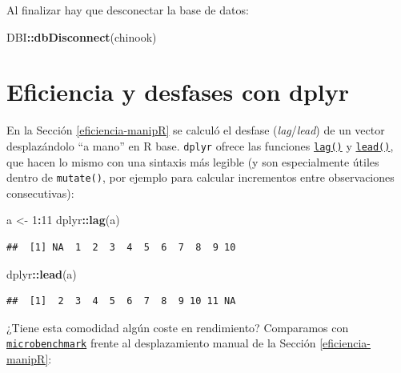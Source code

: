 \documentclass[
]{book}
\newenvironment{Shaded}{\begin{snugshade}}{\end{snugshade}}
\newcommand{\DecValTok}[1]{\textcolor[rgb]{0.00,0.00,0.81}{#1}}
\newcommand{\FunctionTok}[1]{\textcolor[rgb]{0.13,0.29,0.53}{\textbf{#1}}}
\newcommand{\NormalTok}[1]{#1}
\newcommand{\OtherTok}[1]{\textcolor[rgb]{0.56,0.35,0.01}{#1}}
\newcommand{\SpecialCharTok}[1]{\textcolor[rgb]{0.81,0.36,0.00}{\textbf{#1}}}
\theoremstyle{break}
\theoremstyle{nonumberplain}
\begin{document}
Al finalizar hay que desconectar la base de datos:

\begin{Shaded}
\begin{Highlighting}[]
\NormalTok{DBI}\SpecialCharTok{::}\FunctionTok{dbDisconnect}\NormalTok{(chinook)}
\end{Highlighting}
\end{Shaded}

\section{Eficiencia y desfases con dplyr}\label{eficiencia-tidyverse}

En la Sección \ref{eficiencia-manipR} se calculó el desfase (\emph{lag}/\emph{lead}) de un vector desplazándolo ``a mano'' en R base. \texttt{dplyr} ofrece las funciones \href{https://dplyr.tidyverse.org/reference/lead-lag.html}{\texttt{lag()}} y \href{https://dplyr.tidyverse.org/reference/lead-lag.html}{\texttt{lead()}}, que hacen lo mismo con una sintaxis más legible (y son especialmente útiles dentro de \texttt{mutate()}, por ejemplo para calcular incrementos entre observaciones consecutivas):

\begin{Shaded}
\begin{Highlighting}[]
\NormalTok{a }\OtherTok{\textless{}{-}} \DecValTok{1}\SpecialCharTok{:}\DecValTok{11}
\NormalTok{dplyr}\SpecialCharTok{::}\FunctionTok{lag}\NormalTok{(a)}
\end{Highlighting}
\end{Shaded}

\begin{verbatim}
##  [1] NA  1  2  3  4  5  6  7  8  9 10
\end{verbatim}

\begin{Shaded}
\begin{Highlighting}[]
\NormalTok{dplyr}\SpecialCharTok{::}\FunctionTok{lead}\NormalTok{(a)}
\end{Highlighting}
\end{Shaded}

\begin{verbatim}
##  [1]  2  3  4  5  6  7  8  9 10 11 NA
\end{verbatim}

¿Tiene esta comodidad algún coste en rendimiento? Comparamos con \href{https://github.com/joshuaulrich/microbenchmark/}{\texttt{microbenchmark}} frente al desplazamiento manual de la Sección \ref{eficiencia-manipR}:
\end{document}

